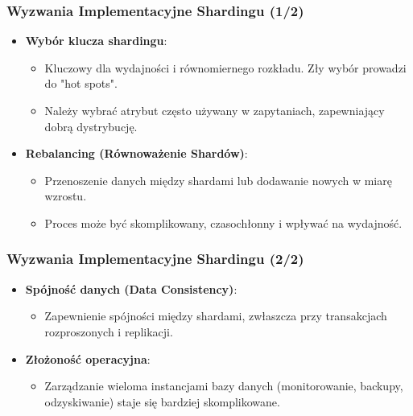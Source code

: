 \documentclass[aspectratio=169,xcolor=table]{beamer}
\begin{document}
\begin{frame}
  \frametitle{Wyzwania Implementacyjne Shardingu (1/2)}
  \begin{itemize}
    \item \textbf{Wybór klucza shardingu}:
        \begin{itemize}
            \item Kluczowy dla wydajności i równomiernego rozkładu. Zły wybór prowadzi do "hot spots".
            \item Należy wybrać atrybut często używany w zapytaniach, zapewniający dobrą dystrybucję.
        \end{itemize}
    \item \textbf{Rebalancing (Równoważenie Shardów)}:
        \begin{itemize}
            \item Przenoszenie danych między shardami lub dodawanie nowych w miarę wzrostu.
            \item Proces może być skomplikowany, czasochłonny i wpływać na wydajność.
        \end{itemize}
  \end{itemize}
\end{frame}

\begin{frame}
  \frametitle{Wyzwania Implementacyjne Shardingu (2/2)}
  \begin{itemize}
    \item \textbf{Spójność danych (Data Consistency)}:
        \begin{itemize}
            \item Zapewnienie spójności między shardami, zwłaszcza przy transakcjach rozproszonych i replikacji.
        \end{itemize}
    \item \textbf{Złożoność operacyjna}:
        \begin{itemize}
            \item Zarządzanie wieloma instancjami bazy danych (monitorowanie, backupy, odzyskiwanie) staje się bardziej skomplikowane.
        \end{itemize}
  \end{itemize}
\end{frame}
\end{document}
